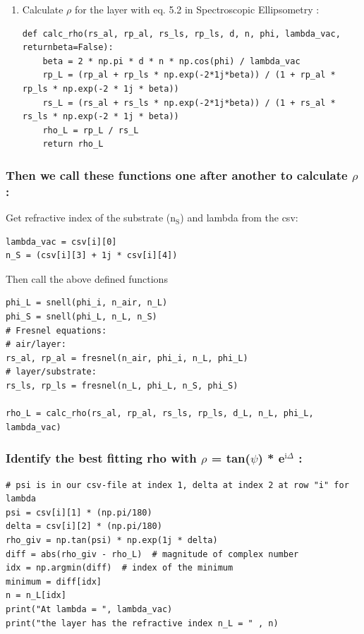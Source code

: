 \documentclass[11pt]{article}
\begin{document}
\begin{enumerate}
\item Calculate \(\rho\) for the layer with eq. 5.2 in Spectroscopic Ellipsometry :
\label{sec:org0685a67}
\begin{verbatim}
def calc_rho(rs_al, rp_al, rs_ls, rp_ls, d, n, phi, lambda_vac, returnbeta=False):
    beta = 2 * np.pi * d * n * np.cos(phi) / lambda_vac
    rp_L = (rp_al + rp_ls * np.exp(-2*1j*beta)) / (1 + rp_al * rp_ls * np.exp(-2 * 1j * beta))
    rs_L = (rs_al + rs_ls * np.exp(-2*1j*beta)) / (1 + rs_al * rs_ls * np.exp(-2 * 1j * beta))
    rho_L = rp_L / rs_L
    return rho_L
\end{verbatim}
\end{enumerate}


\subsubsection{Then we call these functions one after another to calculate \(\rho\):}
\label{sec:orge5156d4}
Get refractive index of the substrate (n\(_{\text{S}}\)) and lambda from the csv:
\begin{verbatim}
lambda_vac = csv[i][0]
n_S = (csv[i][3] + 1j * csv[i][4])
\end{verbatim}

Then call the above defined functions
\begin{verbatim}
phi_L = snell(phi_i, n_air, n_L)
phi_S = snell(phi_L, n_L, n_S)
# Fresnel equations:
# air/layer:
rs_al, rp_al = fresnel(n_air, phi_i, n_L, phi_L)
# layer/substrate:
rs_ls, rp_ls = fresnel(n_L, phi_L, n_S, phi_S)

rho_L = calc_rho(rs_al, rp_al, rs_ls, rp_ls, d_L, n_L, phi_L, lambda_vac)
\end{verbatim}


\subsubsection{Identify the best fitting rho with \(\rho\) = tan(\(\psi\)) * e\(^{\text{i}\Delta}\) :}
\label{sec:orgf34e79e}

\begin{verbatim}
# psi is in our csv-file at index 1, delta at index 2 at row "i" for lambda
psi = csv[i][1] * (np.pi/180)
delta = csv[i][2] * (np.pi/180)
rho_giv = np.tan(psi) * np.exp(1j * delta)
diff = abs(rho_giv - rho_L)  # magnitude of complex number
idx = np.argmin(diff)  # index of the minimum
minimum = diff[idx]
n = n_L[idx]
print("At lambda = ", lambda_vac)
print("the layer has the refractive index n_L = " , n)
\end{verbatim}
\end{document}
